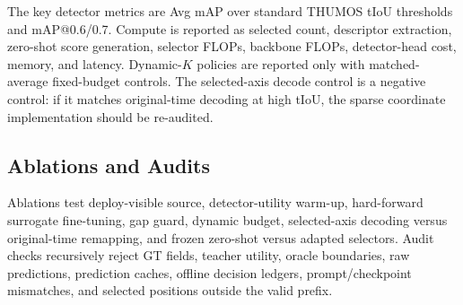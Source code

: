 \begin{table}[t]
\centering
\caption{Sparse detector protocol. All sparse policies must use the same
detector training recipe, selected-count budget, and original-time decoding
unless an ablation explicitly changes one factor.}
\label{tab:sparse_detector}
\setlength{\tabcolsep}{2pt}
\small
{}
\end{table}

The key detector metrics are Avg mAP over standard THUMOS tIoU thresholds and
mAP@0.6/0.7. Compute is reported as selected count, descriptor extraction,
zero-shot score generation, selector FLOPs, backbone FLOPs, detector-head cost,
memory, and latency. Dynamic-$K$ policies are reported only with
matched-average fixed-budget controls. The selected-axis decode control is a
negative control: if it matches original-time decoding at high tIoU, the sparse
coordinate implementation should be re-audited.

\subsection{Ablations and Audits}

Ablations test deploy-visible source, detector-utility warm-up, hard-forward
surrogate fine-tuning, gap guard, dynamic budget, selected-axis decoding versus
original-time remapping, and frozen zero-shot versus adapted selectors. Audit
checks recursively reject GT fields, teacher utility, oracle boundaries, raw
predictions, prediction caches, offline decision ledgers, prompt/checkpoint
mismatches, and selected positions outside the valid prefix.
